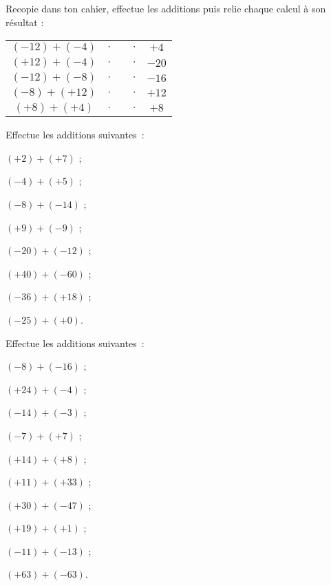 

\begin{exercice}
Recopie dans ton cahier, effectue les additions puis relie chaque calcul à son résultat :
\begin{center}
 \begin{tabularx}{0.95\linewidth}{|cc|X|cc|}
  \cline{1-2}\cline{4-5}
  $(- 12) + (- 4)$ & $\cdot$ & & $\cdot$ & $+ 4$ \\ \cline{1-2}\cline{4-5}
  $(+ 12) + (- 4)$ & $\cdot$ & & $\cdot$ & $- 20$ \\ \cline{1-2}\cline{4-5}
  $(- 12) + (- 8)$ & $\cdot$ & & $\cdot$ & $- 16$ \\ \cline{1-2}\cline{4-5}
  $(- 8) + (+ 12)$ & $\cdot$ & & $\cdot$ & $+ 12$ \\ \cline{1-2}\cline{4-5}
  $(+ 8) + (+ 4)$ & $\cdot$ & & $\cdot$ & $+ 8$ \\ \cline{1-2}\cline{4-5}
  \end{tabularx}
  \end{center}
\end{exercice}

\begin{exercice}
Effectue les additions suivantes :
\begin{colenumerate}{2}
 \item $(+ 2) + (+ 7)$ ;
 \item $(- 4) + (+ 5)$ ;
 \item $(- 8) + (- 14)$ ;
 \item $(+ 9) + (- 9)$ ;
 \item $(- 20) + (- 12)$ ;
 \item $(+ 40) + (- 60)$ ;
 \item $(- 36) + (+ 18)$ ;
 \item $(- 25) + (+ 0)$.
 \end{colenumerate}
\end{exercice}


\begin{exercice}
Effectue les additions suivantes :
\begin{colenumerate}{2}
 \item $(- 8) + (- 16)$ ;
 \item $(+ 24) + (- 4)$ ;
 \item $(- 14) + (- 3)$ ;
 \item $(- 7) + (+ 7)$ ;
 \item $(+ 14) + (+ 8)$ ;
 \item $(+ 11) + (+ 33)$ ;
 \item $(+ 30) + (- 47)$ ;
 \item $(+ 19) + (+ 1)$ ;
 \item $(- 11) + (- 13)$ ;
 \item $(+ 63) + (- 63)$.
 \end{colenumerate}
\end{exercice}


